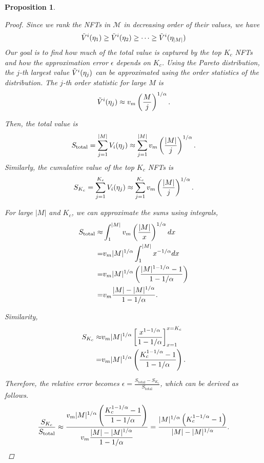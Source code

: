 \documentclass[conference]{IEEEtran}
\theoremstyle{plain}
\newtheorem{proposition}{Proposition}
\begin{document}
\begin{proposition}
{\begin{proof}
Since we rank the NFTs in $\mathcal{M}$ in decreasing order of their values, we have
\begin{equation}\small
    \Tilde{V}^i(\eta_1) \geq \Tilde{V}^i(\eta_2) \geq \dots \geq \Tilde{V}^i(\eta_{|M|})
\end{equation}
Our goal is to find how much of the total value is captured by the top $K_c$ NFTs and how the approximation error $\epsilon$ depends on $K_c$. Using the Pareto distribution, the $j$-th largest value $\Tilde{V}^i(\eta_j)$ can be approximated using the order statistics of the distribution. The $j$-th order statistic for large $M$ is
\begin{equation}\small
    \Tilde{V}^i(\eta_j) \approx v_m \left( \frac{M}{j} \right)^{1/\alpha}.
\end{equation}

Then, the total value is
\begin{equation}\small
    S_{\text{total}} = \sum_{j=1}^{|M|} V_i(\eta_j) \approx \sum_{j=1}^{|M|} v_m \left( \frac{|M|}{j} \right)^{1/\alpha}.
\end{equation}
Similarly, the cumulative value of the top $K_c$ NFTs is 
\begin{equation}\small
    S_{K_c} = \sum_{j=1}^{K_c} V_i(\eta_j) \approx \sum_{j=1}^{K_c} v_m \left( \frac{|M|}{j} \right)^{1/\alpha}.
\end{equation}

For large $|M|$ and $K_c$, we can approximate the sums using integrals,
\begin{align*}\small
    S_{\text{total}} \approx & \int_{1}^{|M|} v_m \left( \frac{|M|}{x} \right)^{1/\alpha} dx  \\ = & v_m |M|^{1/\alpha} \int_{1}^{|M|} x^{-1/\alpha} dx \\ = & v_m |M|^{1/\alpha} \left( \frac{|M|^{1 - 1/\alpha} - 1}{1 - 1/\alpha} \right)
    \\ = & v_m \frac{|M| - |M|^{1/\alpha}}{1 - 1/\alpha}.
\end{align*}

Similarity, 
\begin{align*}\small
    S_{K_c} \approx &  v_m |M|^{1/\alpha} \left[ \frac{x^{1 - 1/\alpha}}{1 - 1/\alpha} \right]_{x=1}^{x=K_c} \\ = &  v_m |M|^{1/\alpha} \left( \frac{K_c^{1 - 1/\alpha} - 1}{1 - 1/\alpha} \right).
\end{align*}

Therefore, the relative error becomes $\epsilon = \frac{S_{\text{total}} - S_{K_c}}{S_{\text{total}}}$, which can be derived as follows.
\begin{equation}\small
    \frac{S_{K_c}}{S_{\text{total}}} \approx \frac{v_m |M|^{1/\alpha} \left( \dfrac{K_c^{1 - 1/\alpha} - 1}{1 - 1/\alpha} \right)}{v_m \dfrac{|M| - |M|^{1/\alpha}}{1 - 1/\alpha}} = \frac{|M|^{1/\alpha} \left( K_c^{1 - 1/\alpha} - 1 \right)}{|M| - |M|^{1/\alpha}}.
\end{equation}


\end{proof}}
\end{proposition}
\end{document}
